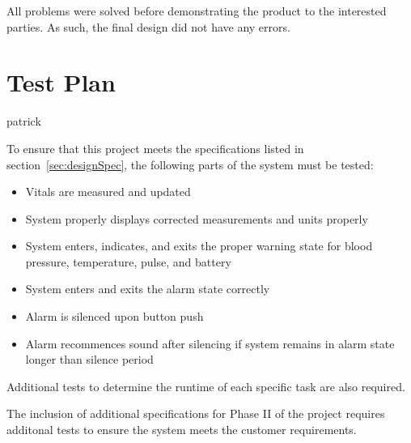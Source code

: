 \documentclass[12pt]{article} %
\begin{document}
    All problems were solved before demonstrating the product to the interested
    parties. As such, the final design did not have any errors.

    \section{Test Plan} patrick

    To ensure that this project meets the specifications listed in 
    section~\ref{sec:designSpec}, the following parts of the system must be 
    tested: 

    \begin{itemize}
      \item Vitals are measured and updated
      \item System properly displays corrected measurements and units properly
      \item System enters, indicates, and exits the proper warning state for
	blood pressure, temperature, pulse, and battery
      \item System enters and exits the alarm state correctly
      \item Alarm is silenced upon button push
      \item Alarm recommences sound after silencing if system remains in alarm
	state longer than silence period
    \end{itemize}

    Additional tests to determine the runtime of each specific task are also
    required.

    The inclusion of additional specifications for Phase II of the project
    requires additonal tests to ensure the system meets the customer
    requirements.
\end{document}
